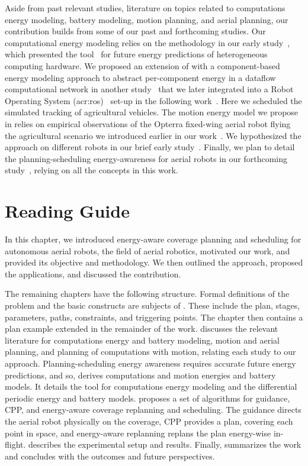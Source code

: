 Aside from past relevant studies, literature on topics related to computations energy modeling, battery modeling, motion planning, and aerial planning, our contribution builds from some of our past and forthcoming studies. Our computational energy modeling relies on the methodology in our early study~\citep{seewald2019coarse}, which presented the \powprof{} tool~\citep{powprofiler} for future energy predictions of heterogeneous computing hardware. We proposed an extension of \powprof{} with a component-based energy modeling approach to abstract per-component energy in a dataflow computational network in another study~\citep{seewald2019component} that we later integrated into a Robot Operating System (\Gls{acr:ros})~\citep{quigley2009ros} set-up in the following work~\citep{zamanakos2020energy}. Here we scheduled the simulated tracking of agricultural vehicles. The motion energy model we propose in  relies on empirical observations of the Opterra fixed-wing aerial robot flying the agricultural scenario we introduced earlier in our work~\citep{seewald2020mechanical}. We hypothesized the approach on different robots in our brief early study~\citep{seewald2020beyond}. Finally, we plan to detail the planning-scheduling energy-awareness for aerial robots in our forthcoming study~\citep{seewald202Xenergy}, relying on all the concepts in this work. 


\section{Reading Guide}
\label{sec:structure}

In this chapter, we introduced energy-aware coverage planning and scheduling for autonomous aerial robots, the field of aerial robotics, motivated our work, and provided its objective and methodology. We then outlined the approach, proposed the applications, and discussed the contribution.

The remaining chapters have the following structure. Formal definitions of the problem and the basic constructs are subjects of . These include the plan, stages, parameters, paths, constraints, and triggering points. The chapter then contains a plan example extended in the remainder of the work.  discusses the relevant literature for computations energy and battery modeling, motion and aerial planning, and planning of computations with motion, relating each study to our approach. Planning-scheduling energy awareness requires accurate future energy predictions, and so,  derives computations and motion energies and battery models. It details the \powprof{} tool for computations energy modeling and the differential periodic energy and battery models.  proposes a set of algorithms for guidance, CPP, and energy-aware coverage replanning and scheduling. The guidance directs the aerial robot physically on the coverage, CPP provides a plan, covering each point in space, and energy-aware replanning replans the plan energy-wise in-flight.  describes the experimental setup and results. Finally,  summarizes the work and concludes with the outcomes and future perspectives.


